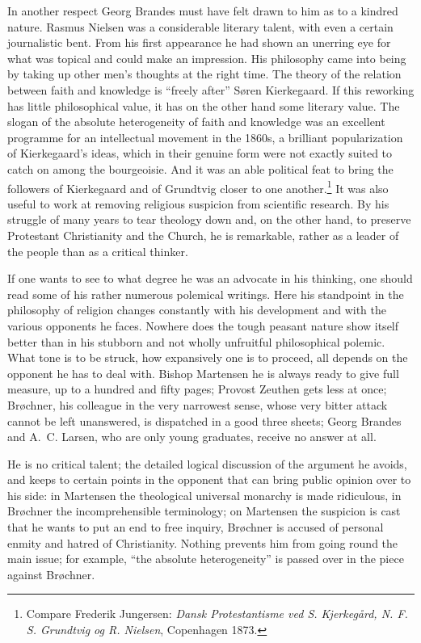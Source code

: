 \documentclass[12pt,a4paper,openany]{book}
\newcommand{\opage}[1]{\marginnote{\footnotesize\textit{[#1]}}}
\begin{document}
In another respect Georg Brandes must have felt drawn to him as to a kindred nature. Rasmus Nielsen was a
considerable literary talent, with even a certain journalistic bent. From his first appearance he had shown an
unerring eye for what was topical and could make an impression. His philosophy
\opage{148}\setcounter{footnote}{0}%
came into being by taking up other men's thoughts at the right time. The theory of the relation between faith and
knowledge is ``freely after'' Søren Kierkegaard. If this reworking has little philosophical value, it has on the
other hand some literary value. The slogan of the absolute heterogeneity of faith and knowledge was an excellent
programme for an intellectual movement in the 1860s, a brilliant popularization of Kierkegaard's ideas, which in
their genuine form were not exactly suited to catch on among the bourgeoisie. And it was an able political feat to
bring the followers of Kierkegaard and of Grundtvig closer to one
another.\footnote{Compare Frederik Jungersen: \textit{Dansk Protestantisme ved S. Kjerkegård, N. F. S. Grundtvig og R. Nielsen}, Copenhagen 1873.}
It was also useful to work at removing religious suspicion from scientific research. By his struggle of many years
to tear theology down and, on the other hand, to preserve Protestant Christianity and the Church, he is remarkable,
rather as a leader of the people than as a critical thinker.

If one wants to see to what degree he was an advocate in his thinking, one should read some of his rather numerous
polemical writings. Here his standpoint in the philosophy of religion changes constantly with his development and
with the various opponents he faces. Nowhere does the tough peasant nature show itself better than in his stubborn
and not wholly unfruitful philosophical polemic. What tone is to be struck, how expansively one is to proceed, all
depends on the opponent he has to deal with. Bishop Martensen he is always ready to give full measure, up to a
hundred and fifty pages; Provost Zeuthen gets less at once; Brøchner, his colleague in the very narrowest sense,
whose very bitter attack cannot be left unanswered, is dispatched in a good three sheets; Georg Brandes and A.~C.
Larsen, who are only young graduates, receive no answer at all.

He is no critical talent; the detailed logical discussion of the argument he avoids, and keeps to certain points
in the opponent that can bring public opinion over to his side: in Martensen the theological universal monarchy is
made ridiculous, in Brøchner the incomprehensible terminology; on Martensen the suspicion is cast that he wants to
put an end to free inquiry, Brøchner is accused of personal enmity and hatred of Christianity. Nothing prevents him
from going
\opage{149}\setcounter{footnote}{0}%
round the main issue; for example, ``the absolute heterogeneity'' is passed over in the piece against Brøchner.
\end{document}
